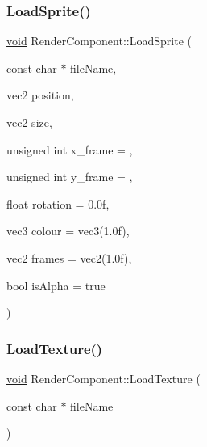 \subsubsection{\texorpdfstring{Load\+Sprite()}{LoadSprite()}}
{\footnotesize\ttfamily \hyperlink{imgui__impl__opengl3__loader_8h_ac668e7cffd9e2e9cfee428b9b2f34fa7}{void} Render\+Component\+::\+Load\+Sprite (\begin{DoxyParamCaption}\item[{const char $\ast$}]{file\+Name,  }\item[{vec2}]{position,  }\item[{vec2}]{size,  }\item[{unsigned int}]{x\+\_\+frame = {},  }\item[{unsigned int}]{y\+\_\+frame = {},  }\item[{float}]{rotation = {\ttfamily 0.0f},  }\item[{vec3}]{colour = {\ttfamily vec3(1.0f)},  }\item[{vec2}]{frames = {\ttfamily vec2(1.0f)},  }\item[{bool}]{is\+Alpha = {\ttfamily true} }\end{DoxyParamCaption})}

\mbox{\label{classRenderComponent_a62bf78722e9498c3c25f99d294325393}} 
\subsubsection{\texorpdfstring{Load\+Texture()}{LoadTexture()}}
{\footnotesize\ttfamily \hyperlink{imgui__impl__opengl3__loader_8h_ac668e7cffd9e2e9cfee428b9b2f34fa7}{void} Render\+Component\+::\+Load\+Texture (\begin{DoxyParamCaption}\item[{const char $\ast$}]{file\+Name }\end{DoxyParamCaption})\hspace{0.3cm}{\ttfamily [inline]}}

\mbox{\label{classRenderComponent_a402d72e1fa9f7d4e21de7790a77b6c95}} 
